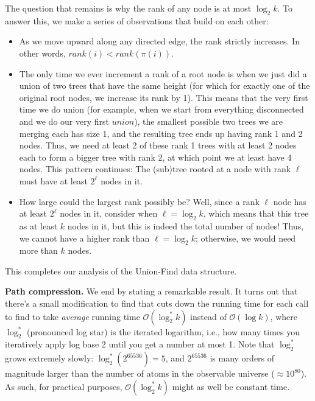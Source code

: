 The question that remains is why the rank of any node is at most $\log_2 k$. To answer this, we make a series of observations that build on each other:

\begin{itemize}
\item As we move upward along any directed edge, the rank strictly increases. In other words, $rank(i)<rank(\pi(i))$.

\item The only time we ever increment a rank of a root node is when we just did a union of two trees that have the same height (for which for exactly one of the original root nodes, we increase its rank by 1). This means that the very first time we do union (for example, when we start from everything disconnected and we do our very first $union$), the smallest possible two trees we are merging each has size 1, and the resulting tree ends up having rank 1 and 2 nodes. Thus, we need at least 2 of these rank 1 trees with at least 2 nodes each to form a bigger tree with rank 2, at which point we at least have 4 nodes. This pattern continues: The (sub)tree rooted at a node with rank $\ell$ must have at least $2^{\ell}$ nodes in it.

\item How large could the largest rank possibly be? Well, since a rank $\ell$ node has at least $2^{\ell}$ nodes in it, consider when $\ell =\log _{2}k$, which means that this tree as at least $k$ nodes in it, but this is indeed the total number of nodes! Thus, we cannot have a higher rank than $\ell =\log _{2}k$; otherwise, we would need more than $k$ nodes.
\end{itemize}

This completes our analysis of the Union-Find data structure.

\textbf{Path compression.} We end by stating a remarkable result. It turns out that there's a small modification to find that cuts down the running time for each call to find to take \textit{average} running time $\mathcal{O}(\log_2^{*} k)$ instead of $\mathcal{O}(\log k)$, where $\log_2^{*}$ (pronounced log star) is the iterated logarithm, i.e., how many times you iteratively apply log base 2 until you get a number at most 1. Note that $\log_2^{*}$ grows extremely slowly: $\log _2^*(2^{65536}) = 5$, and $2^{65536}$ is many orders of magnitude larger than the number of atoms in the observable universe ($\approx 10^{80}$). As such, for practical purposes, $\mathcal{O}(\log_2^{*} k)$ might as well be constant time.

